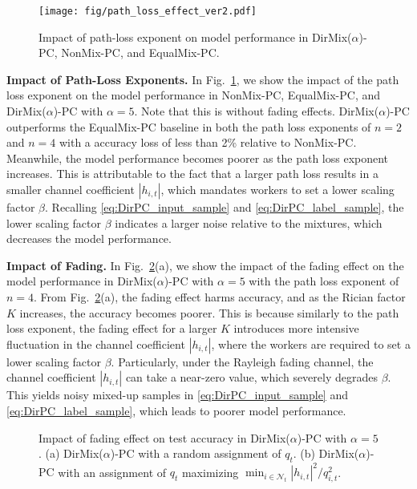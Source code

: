 \documentclass[conference,10pt]{IEEEtran}
\theoremstyle{definition}
\theoremstyle{definition}
\begin{document}
\begin{figure}[t]
	\centering
	\texttt{[image: fig/path\_loss\_effect\_ver2.pdf]}
	\caption{Impact of path-loss exponent on model performance in \textsf{DirMix($\alpha$)-PC}, \textsf{NonMix-PC}, and \textsf{EqualMix-PC}.}
	\label{fig:pathloss_impact}
	\vspace{-1em}
\end{figure}

\vspace{.3em}\noindent\textbf{Impact of Path-Loss Exponents.}\quad
In Fig.~\ref{fig:pathloss_impact}, we show the impact of the path loss exponent on the model performance in   \textsf{NonMix-PC}, \textsf{EqualMix-PC}, and \textsf{DirMix($\alpha$)-PC} with $\alpha = 5$.
Note that this is without fading effects.
\textsf{DirMix($\alpha$)-PC} outperforms the \textsf{EqualMix-PC} baseline in both the path loss exponents of $n = 2$ and $n = 4$ with a accuracy loss of less than 2\% relative to \textsf{NonMix-PC}.
Meanwhile, the model performance becomes poorer as the path loss exponent increases.
This is attributable to the fact that a larger path loss results in a smaller channel coefficient $|h_{i, t}|$, which mandates workers to set a lower scaling factor $\beta$.
Recalling \eqref{eq:DirPC_input_sample} and \eqref{eq:DirPC_label_sample}, the lower scaling factor $\beta$ indicates a larger noise relative to the mixtures, which decreases the model performance.

\vspace{.3em}\noindent\textbf{Impact of Fading.}\quad
In Fig.~\ref{fig:fading_impact}(a), we show the impact of the fading effect on the model performance in  \textsf{DirMix($\alpha$)-PC} with $\alpha = 5$ with the path loss exponent of $n = 4$.
From Fig.~\ref{fig:fading_impact}(a), the fading effect harms accuracy, and as the Rician factor $K$ increases, the accuracy becomes poorer.
This is because similarly to the path loss exponent, the fading effect for a larger $K$ introduces more intensive fluctuation in the channel coefficient $|h_{i, t}|$, where the workers are required to set a lower scaling factor $\beta$.
Particularly, under the Rayleigh fading channel, the channel coefficient $|h_{i, t}|$ can take a near-zero value, which severely degrades $\beta$.
This yields noisy mixed-up samples in \eqref{eq:DirPC_input_sample} and \eqref{eq:DirPC_label_sample}, which leads to poorer model performance.

\begin{figure}[t]
	\centering
	\caption{
	Impact of fading effect on test accuracy in \textsf{DirMix($\alpha$)-PC} with $\alpha=5$.
	(a) \textsf{DirMix($\alpha$)-PC} with a random assignment of $q_t$.
	(b) \textsf{DirMix($\alpha$)-PC} with an assignment of $q_t$ maximizing $\min_{i\in\mathcal{N}_t}{|h_{i, t}|^2}/{q_{i, t}^2}$.
	}
	\label{fig:fading_impact}
	\vspace{-1em}
\end{figure}
\end{document}

